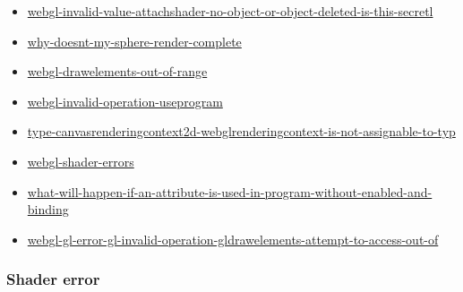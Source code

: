\begin{itemize}
\item
  \href{http://stackoverflow.com/questions/14641618/webgl-invalid-value-attachshader-no-object-or-object-deleted-is-this-secretl}{webgl-invalid-value-attachshader-no-object-or-object-deleted-is-this-secretl}
\item
  \href{http://stackoverflow.com/questions/34617490/why-doesnt-my-sphere-render-complete}{why-doesnt-my-sphere-render-complete}
\item
  \href{http://stackoverflow.com/questions/15751791/webgl-drawelements-out-of-range/15753839\#15753839}{webgl-drawelements-out-of-range}
\item
  \href{http://stackoverflow.com/questions/11998781/webgl-invalid-operation-useprogram/11998987\#11998987}{webgl-invalid-operation-useprogram}
\item
  \href{http://stackoverflow.com/questions/32115328/type-canvasrenderingcontext2d-webglrenderingcontext-is-not-assignable-to-typ/32116589\#32116589}{type-canvasrenderingcontext2d-webglrenderingcontext-is-not-assignable-to-typ}
\item
  \href{http://stackoverflow.com/questions/11216912/webgl-shader-errors/11217704\#11217704}{webgl-shader-errors}
\item
  \href{http://stackoverflow.com/questions/21128464/what-will-happen-if-an-attribute-is-used-in-program-without-enabled-and-binding}{what-will-happen-if-an-attribute-is-used-in-program-without-enabled-and-binding}
\item
  \href{http://stackoverflow.com/questions/21200386/webgl-gl-error-gl-invalid-operation-gldrawelements-attempt-to-access-out-of/21212640\#21212640}{webgl-gl-error-gl-invalid-operation-gldrawelements-attempt-to-access-out-of}
\end{itemize}

\subsubsection{Shader error}\label{shader-error}


